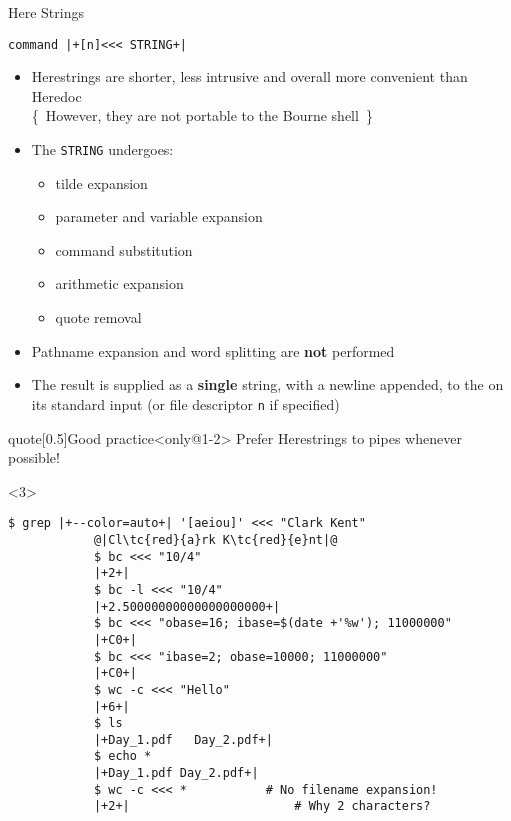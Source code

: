 \begin{frame}[fragile]{Here Strings}
    \vspace{-1mm}
    \begin{lstlisting}[style=MyBash, numbers=none]
        command |+[n]<<< STRING+|
    \end{lstlisting}
    \begin{itemize}[<only@1-2>]
        \item Herestrings are shorter, less intrusive and overall more convenient than Heredoc\\[-0.5ex]
              {\tiny\{~However, they are not portable to the Bourne shell~\}}
        \item The \texttt{STRING} undergoes:
              \begin{itemize}
                  \item tilde expansion
                  \item parameter and variable expansion
                  \item command substitution
                  \item arithmetic expansion
                  \item quote removal
              \end{itemize}
        \item \alert{Pathname expansion} and word splitting \alert{are \textbf{not} performed}
        \item The result is supplied as a \alert{\textbf{single}} string, with a newline appended, to the  on its standard input (or file descriptor \texttt{n} if specified)
    \end{itemize}
    \begin{varblock}{quote}[0.5\textwidth]{Good practice}<only@1-2>
        \textnormal{Prefer Herestrings to pipes whenever possible!}
    \end{varblock}
    \begin{onlyenv}<3>
        \begin{lstlisting}[style=MyBash, style=oddnumbers]
            $ grep |+--color=auto+| '[aeiou]' <<< "Clark Kent"
            @|Cl\tc{red}{a}rk K\tc{red}{e}nt|@
            $ bc <<< "10/4"
            |+2+|
            $ bc -l <<< "10/4"
            |+2.50000000000000000000+|
            $ bc <<< "obase=16; ibase=$(date +'%w'); 11000000"
            |+C0+|
            $ bc <<< "ibase=2; obase=10000; 11000000"
            |+C0+|
            $ wc -c <<< "Hello"
            |+6+|
            $ ls
            |+Day_1.pdf   Day_2.pdf+|
            $ echo *
            |+Day_1.pdf Day_2.pdf+|
            $ wc -c <<< *           # No filename expansion!
            |+2+|                       # Why 2 characters?
        \end{lstlisting}
    \end{onlyenv}
\end{frame}

